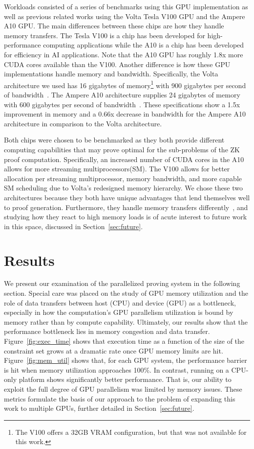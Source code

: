 \documentclass[sigconf]{acmart}
\begin{document}
Workloads consisted of a series of benchmarks using this GPU implementation as well as previous related works\cite{talthesis} using the Volta Tesla V100 GPU and the Ampere A10 GPU. The main differences between these chips are how they handle memory transfers. The Tesla V100 is a chip has been developed for high-performance computing applications while the A10 is a chip has been developed for efficiency in AI applications. Note that the A10 GPU has roughly 1.8x more CUDA cores available than the V100. Another difference is how these GPU implementations handle memory and bandwidth. Specifically, the Volta architecture we used has 16 gigabytes of memory\footnote{The V100 offers a 32GB VRAM configuration, but that was not available for this work.}  with 900 gigabytes per second of bandwidth~\cite{NVIDIAvolta}. The Ampere A10 architecture supplies 24 gigabytes of memory with 600 gigabytes per second of bandwidth~\cite{NVIDIAa10Datasheet}. These specifications show a 1.5x improvement in memory and a 0.66x decrease in bandwidth for the Ampere A10 architecture in comparison to the Volta architecture. 

Both chips were chosen to be benchmarked as they both provide different computing capabilities that may prove optimal for the sub-problems of the ZK proof computation. Specifically, an increased number of CUDA cores in the A10 allows for more streaming multiprocessors(SM). The V100 allows for better allocation per streaming multiprocessor, memory bandwidth, and more capable SM scheduling due to Volta’s redesigned memory hierarchy. We chose these two architectures because they both have unique advantages that lend themselves well to proof generation. Furthermore, they handle memory transfers differently~\cite{NVIDIAvolta,A100GPU}, and studying how they react to high memory loads is of acute interest to future work in this space, discussed in Section~\ref{sec:future}. 

\section{Results}
\label{sec:results}

We present our examination of the parallelized proving system in the following section. Special care was placed on the study of GPU memory utilization and the role of data transfers between host (CPU) and device (GPU) as a bottleneck, especially in how the computation's GPU parallelism utilization is bound by memory rather than by compute capability. Ultimately, our results show that the performance bottleneck lies in memory congestion and data transfer. Figure~\ref{fig:exec_time} shows that execution time as a function of the size of the constraint set grows at a dramatic rate once GPU memory limits are hit. Figure~\ref{fig:mem_util} shows that, for each GPU system, the performance barrier is hit when memory utilization approaches 100\%. In contrast, running on a CPU-only platform shows significantly better performance. That is, our ability to exploit the full degree of GPU parallelism was limited by memory issues. These metrics formulate the basis of our approach to the problem of expanding this work to multiple GPUs, further detailed in Section~\ref{sec:future}. 
\end{document}
